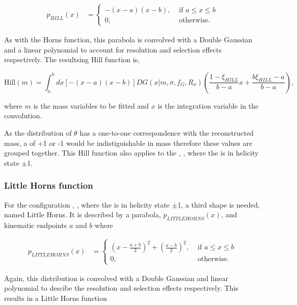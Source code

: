 \begin{align}
p_{HILL}(x) &= \begin{cases}
-(x - a)(x - b), & \text{ if $a \leq x \leq b$}\\ 	
0, & \text{ otherwise.}
\end{cases} 
\end{align}

As with the Horns function, this parabola is convolved with a Double Gaussian and a linear polynomial to account for resolution and selection effects respectively. The resultsing Hill function is,

\begin{equation}
\text{Hill}(m) = \int_a^b dx \left[-(x - a)(x - b)\right] DG(x|m,\sigma,f_G,R_{\sigma}) \left( \frac{1 - \xi_{HILL}}{b - a}x + \frac{b\xi_{HILL} - a}{b - a}\right),
\label{eqn:hill}
\end{equation}

where $m$ is the mass variables to be fitted and $x$ is the integration variable in the convolution.

As the distribution of $\theta$ has a one-to-one correspondence with the reconstructed \B mass, a \Dstar of +1 or -1 would be indistiguishable in \B mass therefore these values are grouped together. This Hill function also applies to the \decay{\Bm}{\Dstarz\Kstarm}, \decay{\Dstarz}{\Dz\piz}, where the \Dstarz is in helicity state $\pm$1.

\subsubsection{Little Horns function}

For the configuration \decay{\Bm}{\Dstarz\Kstarm}, \decay{\Dstarz}{\Dz\gamma}, where the \Dstarz is in helicity state $\pm$1, a third shape is needed, named Little Horns. It is described by a parabola, $p_{LITTLEHORNS}(x)$, and kinematic endpoints $a$ and $b$ where

\begin{align}
p_{LITTLEHORNS}(x) &= \begin{cases}
\left(x - \frac{a+b}{2}\right)^2 + \left(\frac{a-b}{2}\right)^2, & \text{ if $a \leq x \leq b$}\\ 	
0, & \text{ otherwise.}
\end{cases} 
\end{align}

Again, this distribution is convolved with a Double Gaussian and linear polynomial to descibe the resolution and selection effects respectively. This results in a Little Horns function

